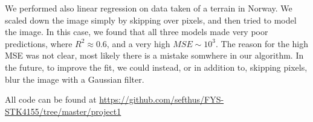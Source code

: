 \documentclass[a4paper,10pt,english]{article}
\begin{document}
We performed also linear regression on data taken of a terrain in Norway. We scaled down the image simply by skipping over pixels, and then tried to model the image. In this case, we found that all three models made very poor predictions, where $R^2\approx0.6$, and a very high $MSE\sim 10^3$. The reason for the high MSE was not clear, most likely there is a mistake somwhere in our algorithm. In the future, to improve the fit, we could instead, or in addition to, skipping pixels, blur the image with a Gaussian filter.

All code can be found at \url{https://github.com/sefthus/FYS-STK4155/tree/master/project1}

\end{document}
